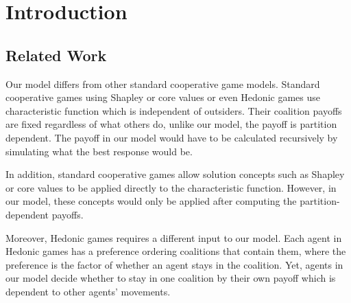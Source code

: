 \section{Introduction}


\noindent {}

\noindent {}

\subsection*{Related Work}
Our model differs from other standard cooperative game models. Standard cooperative games using Shapley or core values or even Hedonic games use characteristic function which is independent of outsiders. Their coalition payoffs are fixed regardless of what others do, unlike our model, the payoff is partition dependent. The payoff in our model would have to be calculated recursively by simulating what the best response would be. 

In addition, standard cooperative games allow solution concepts such as Shapley or core values to be applied directly to the characteristic function. However, in our model, these concepts would only be applied after computing the partition-dependent payoffs. 

Moreover, Hedonic games requires a different input to our model. Each agent in Hedonic games has a preference ordering coalitions that contain them, where the preference is the factor of whether an agent stays in the coalition. Yet, agents in our model decide whether to stay in one coalition by their own payoff which is dependent to other agents' movements.